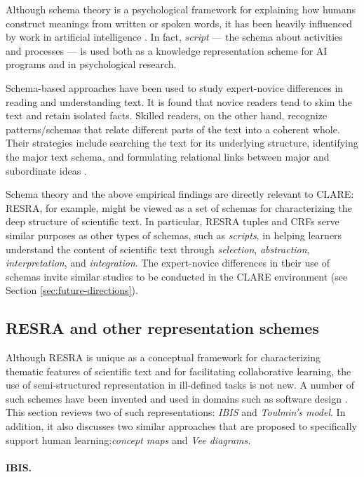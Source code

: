 Although schema theory is a psychological framework for explaining how
humans construct meanings from written or spoken words, it has been heavily
influenced by work in artificial intelligence \cite{Abelson81,Schank77}. In
fact, {\it script\/} --- the schema about activities and processes --- is
used both as a knowledge representation scheme for AI programs and in
psychological research.

Schema-based approaches have been used to study expert-novice differences
in reading and understanding text. It is found that novice readers tend to
skim the text and retain isolated facts. Skilled readers, on the other
hand, recognize patterns/schemas that relate different parts of the text
into a coherent whole. Their strategies include searching the text for its
underlying structure, identifying the major text schema, and formulating
relational links between major and subordinate ideas \cite{Dijk83,Voss83}.

Schema theory and the above empirical findings are directly relevant to
CLARE: RESRA, for example, might be viewed as a set of schemas for
characterizing the deep structure of scientific text. In particular, RESRA
tuples and CRFs serve similar purposes as other types of schemas, such as
{\it scripts\/}, in helping learners understand the content of scientific
text through {\it selection\/}, {\it abstraction\/}, {\it
interpretation\/}, and {\it integration\/}. The expert-novice differences
in their use of schemas invite similar studies to be conducted in the CLARE
environment (see Section \ref{sec:future-directions}).


\subsection{RESRA and other representation schemes}
\label{sec:kr-schemes}

Although RESRA is unique as a conceptual framework for characterizing
thematic features of scientific text and for facilitating collaborative
learning, the use of semi-structured representation in ill-defined tasks is
not new. A number of such schemes have been invented and used in domains
such as software design \cite{Lee91What}. This section reviews two of such
representations: {\it IBIS\/} and {\it Toulmin's model\/}. In addition, it
also discusses two similar approaches that are proposed to specifically
support human learning:{\it concept maps\/} and {\it Vee diagrams.\/}


\paragraph{IBIS.}

